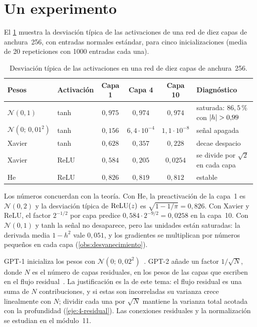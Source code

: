 \section{Un experimento}

El \cref{tab:experimento} muestra la desviación típica de las activaciones de una red de diez capas de anchura~256, con entradas normales estándar, para cinco inicializaciones (media de 20 repeticiones con 1000 entradas cada una).

\begin{table}[h]
\centering\small
\caption{Desviación típica de las activaciones en una red de diez capas de anchura~256.}\label{tab:experimento}
\begin{tabular}{@{}llcccl@{}}
\toprule
Pesos & Activación & Capa 1 & Capa 4 & Capa 10 & Diagnóstico \\
\midrule
$\mathcal{N}(0,1)$ & tanh & $0{,}975$ & $0{,}974$ & $0{,}974$ & saturada: $86{,}5\,\%$ con $\lvert h\rvert>0{,}99$ \\
$\mathcal{N}(0;\,0{,}01^{2})$ & tanh & $0{,}156$ & $6{,}4\cdot 10^{-4}$ & $1{,}1\cdot 10^{-8}$ & señal apagada \\
Xavier & tanh & $0{,}628$ & $0{,}357$ & $0{,}228$ & decae despacio \\
Xavier & ReLU & $0{,}584$ & $0{,}205$ & $0{,}0254$ & se divide por $\sqrt2$ en cada capa \\
He & ReLU & $0{,}826$ & $0{,}819$ & $0{,}812$ & estable \\
\bottomrule
\end{tabular}
\end{table}

Los números concuerdan con la teoría. Con He, la preactivación de la capa~1 es $\mathcal{N}(0,2)$ y la desviación típica de $\operatorname{ReLU}(z)$ es $\sqrt{1-1/\pi}=0{,}826$. Con Xavier y ReLU, el factor $2^{-1/2}$ por capa predice $0{,}584\cdot 2^{-9/2}=0{,}0258$ en la capa~10. Con $\mathcal{N}(0,1)$ y tanh la señal no desaparece, pero las unidades están saturadas: la derivada media $1-h^{2}$ vale $0{,}051$, y los gradientes se multiplican por números pequeños en cada capa (\cref{obs:desvanecimiento}).

\begin{observacion}
GPT-1 inicializa los pesos con $\mathcal{N}(0;\,0{,}02^{2})$~\cite[§4.1]{radford2018}. GPT-2 añade un factor $1/\sqrt{N}$, donde $N$ es el número de capas residuales, en los pesos de las capas que escriben en el flujo residual~\cite[§2.3]{radford2019}. La justificación es la de este tema: el flujo residual es una suma de $N$ contribuciones, y si estas son incorreladas su varianza crece linealmente con $N$; dividir cada una por $\sqrt N$ mantiene la varianza total acotada con la profundidad (\cref{eje:4-residual}). Las conexiones residuales y la normalización se estudian en el módulo~11.
\end{observacion}

